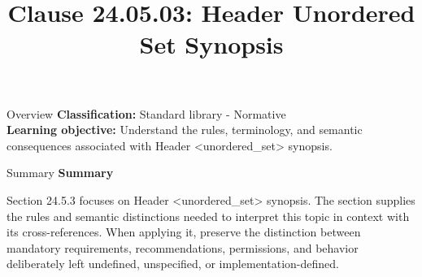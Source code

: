\documentclass[10pt,letterpaper]{article}
\title{Clause 24.05.03: Header Unordered Set Synopsis}
\author{}
\date{}
\begin{document}
\maketitle
\begin{CornellOverviewBox}{Overview}
\textbf{Classification:} Standard library - Normative\\[2pt]
\textbf{Learning objective:} Understand the rules, terminology, and semantic consequences associated with Header <unordered\_set> synopsis.
\end{CornellOverviewBox}\begin{CornellSummaryBox}{Summary}
{\sffamily\bfseries\color{Accent} Summary}\par\vspace{3pt}Section 24.5.3 focuses on Header <unordered\_set> synopsis. The section supplies the rules and semantic distinctions needed to interpret this topic in context with its cross-references. When applying it, preserve the distinction between mandatory requirements, recommendations, permissions, and behavior deliberately left undefined, unspecified, or implementation-defined.
\end{CornellSummaryBox}
\end{document}
